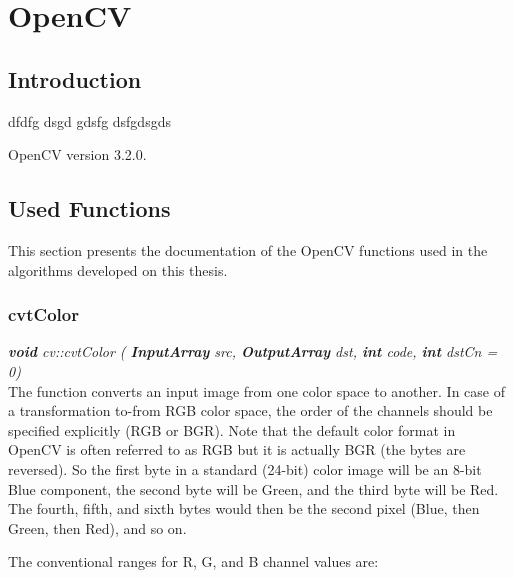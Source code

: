 \chapter{OpenCV}
\label{app:opencv_functions}

\section{Introduction}
\label{sec:opencv_appendix_introduction}


dfdfg dsgd gdsfg dsfgdsgds

OpenCV version 3.2.0.

\section{Used Functions}
\label{sec:opencv_appendix_used_functions}

This section presents the documentation of the OpenCV functions used in the algorithms developed on this thesis.

\subsection*{cvtColor}
\label{subsec:opencv_appendix_used_functions_cvtcolor}

\textit{\textbf{void} cv::cvtColor (
        \textbf{InputArray} src,
		\textbf{OutputArray}  	dst,
		\textbf{int}  	code,
		\textbf{int}  	dstCn = 0)}\\
		
The function converts an input image from one color space to another. In case of a transformation to-from RGB color space, the order of the channels should be specified explicitly (RGB or BGR). Note that the default color format in OpenCV is often referred to as RGB but it is actually BGR (the bytes are reversed). So the first byte in a standard (24-bit) color image will be an 8-bit Blue component, the second byte will be Green, and the third byte will be Red. The fourth, fifth, and sixth bytes would then be the second pixel (Blue, then Green, then Red), and so on.

The conventional ranges for R, G, and B channel values are:

